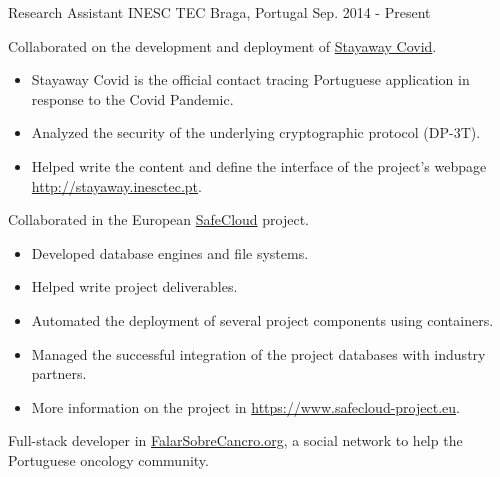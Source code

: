 

\begin{cventries}

  \cventry
    {Research Assistant} %
    {INESC TEC} %
    {Braga, Portugal} %
    {Sep. 2014 - Present} %
    {
      \begin{cvitems} %
        \item {Collaborated on the development and deployment of \href{https://stayaway.inesctec.pt}{Stayaway Covid}.}
        \begin{itemize}
          \item Stayaway Covid is the official contact tracing Portuguese application in response to the Covid Pandemic.
          \item Analyzed the security of the underlying cryptographic protocol (DP-3T).
          \item Helped write the content and define the interface of the project's webpage \href{http://stayaway.inesctec.pt}{http://stayaway.inesctec.pt}.
        \end{itemize}
        \item{Collaborated in the European \href{https://www.safecloud-project.eu}{SafeCloud} project.}
        \begin{itemize}
          \item Developed database engines and file systems.
          \item Helped write project deliverables.
          \item Automated the deployment of several project components using containers.
          \item Managed the successful integration of the project databases with industry partners.
          \item More information on the project in \href{https://www.safecloud-project.eu}{https://www.safecloud-project.eu}.
        \end{itemize}
        \item{Full-stack developer in \href{https://falarsobrecancro.org}{FalarSobreCancro.org}, a social network to help the Portuguese oncology community.}

\end{cvitems}}
\end{cventries}
